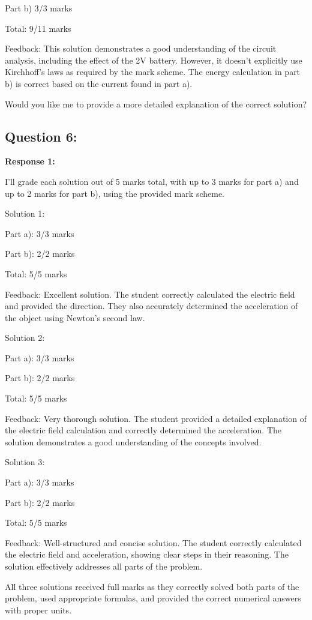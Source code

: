\documentclass[a4paper,11pt]{article}
\begin{document}
Part b) 3/3 marks

Total: 9/11 marks

Feedback: This solution demonstrates a good understanding of the circuit analysis, including the effect of the 2V battery. However, it doesn't explicitly use Kirchhoff's laws as required by the mark scheme. The energy calculation in part b) is correct based on the current found in part a).

Would you like me to provide a more detailed explanation of the correct solution?

\subsection*{Question 6:}

\textbf{Response 1:}

I'll grade each solution out of 5 marks total, with up to 3 marks for part a) and up to 2 marks for part b), using the provided mark scheme.

Solution 1:

Part a): 3/3 marks

Part b): 2/2 marks

Total: 5/5 marks

Feedback: Excellent solution. The student correctly calculated the electric field and provided the direction. They also accurately determined the acceleration of the object using Newton's second law.

Solution 2:

Part a): 3/3 marks

Part b): 2/2 marks

Total: 5/5 marks

Feedback: Very thorough solution. The student provided a detailed explanation of the electric field calculation and correctly determined the acceleration. The solution demonstrates a good understanding of the concepts involved.

Solution 3:

Part a): 3/3 marks

Part b): 2/2 marks

Total: 5/5 marks

Feedback: Well-structured and concise solution. The student correctly calculated the electric field and acceleration, showing clear steps in their reasoning. The solution effectively addresses all parts of the problem.

All three solutions received full marks as they correctly solved both parts of the problem, used appropriate formulas, and provided the correct numerical answers with proper units.
\end{document}
